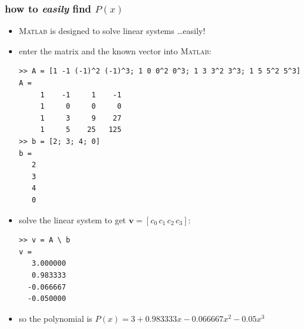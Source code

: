 \documentclass[10pt,hyperref]{beamer}
\newcommand{\bv}{\mathbf{v}}
\newcommand{\Matlab}{\textsc{Matlab}\xspace}
\newcommand{\MO}{\Matlab}
\begin{document}
\begin{frame}[fragile]
\frametitle{how to \emph{easily} find $P(x)$}
  
\begin{itemize}
\item \MO is designed to solve linear systems \dots easily!
\item enter the matrix and the known vector into \MO:

\begin{Verbatim}[frame=single,fontfamily=courier,fontsize=\scriptsize]
>> A = [1 -1 (-1)^2 (-1)^3; 1 0 0^2 0^3; 1 3 3^2 3^3; 1 5 5^2 5^3]
A =
     1    -1     1    -1
     1     0     0     0
     1     3     9    27
     1     5    25   125
>> b = [2; 3; 4; 0]
b =
   2
   3
   4
   0
\end{Verbatim}
\item solve the linear system to get $\bv=[c_0\, c_1\, c_2\, c_3]$:
\begin{Verbatim}[frame=single,fontfamily=courier,fontsize=\scriptsize]
>> v = A \ b
v =
   3.000000
   0.983333
  -0.066667
  -0.050000
\end{Verbatim}
\item so the polynomial is $P(x) = 3 + 0.983333 x - 0.066667 x^2 - 0.05 x^3$
\end{itemize}
\end{frame}
\end{document}
